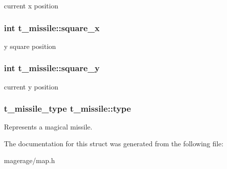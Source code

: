 current x position \hypertarget{structt__missile_a0f63c73c2c0f46fc1187f4ab604b6859}{
\subsubsection[{square\-\_\-x}]{\setlength{\rightskip}{0pt plus 5cm}int t\-\_\-missile\-::square\-\_\-x}}\label{structt__missile_a0f63c73c2c0f46fc1187f4ab604b6859}
y square position \hypertarget{structt__missile_a4787f7554bd035014ca6b4d5b61f4149}{
\subsubsection[{square\-\_\-y}]{\setlength{\rightskip}{0pt plus 5cm}int t\-\_\-missile\-::square\-\_\-y}}\label{structt__missile_a4787f7554bd035014ca6b4d5b61f4149}
current y position \hypertarget{structt__missile_afba313b8a83b91562bef1ccad8ff3f92}{
\subsubsection[{type}]{\setlength{\rightskip}{0pt plus 5cm}t\-\_\-missile\-\_\-type t\-\_\-missile\-::type}}\label{structt__missile_afba313b8a83b91562bef1ccad8ff3f92}
Represents a magical missile. 

The documentation for this struct was generated from the following file\-:\begin{DoxyCompactItemize}
\item 
magerage/map.\-h\end{DoxyCompactItemize}
